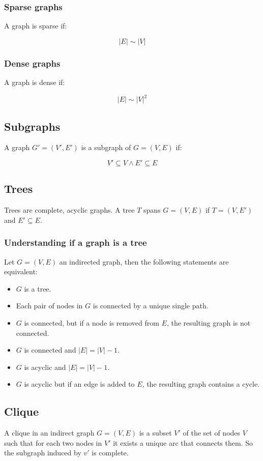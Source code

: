 		\subsubsection{Sparse graphs}
		A graph is sparse if:

		$$|E|\sim|V|$$

		\subsubsection{Dense graphs}
		A graph is dense if:

		$$|E|\sim|V|^2$$

	\subsection{Subgraphs}
	A graph $G' = (V', E')$ is a subgraph of $G = (V,E)$ if:

	$$V'\subseteq V \land E'\subseteq E$$

	\subsection{Trees}
	Trees are complete, acyclic graphs.
	A tree $ T$ spans $G = (V,E)$ if $T = (V,E')$ and $E'\subseteq E$.

		\subsubsection{Understanding if a graph is a tree}
		Let $G = (V,E)$ an indirected graph, then the following statements are equivalent:

		\begin{multicols}{2}
			\begin{itemize}
				\item $G$ is a tree.
				\item Each pair of nodes in $G$ is connected by a unique single path.
				\item $G$ is connected, but if a node is removed from $E$, the resulting graph is not connected.
				\item $G$ is connected and $|E| = |V|-1$.
				\item $G$ is acyclic and $|E| = |V|-1$.
				\item $G$ is acyclic but if an edge is added to $E$, the resulting graph contains a cycle.
			\end{itemize}
		\end{multicols}

	\subsection{Clique}
	A clique in an indirect graph $G = (V,E)$ is a subset $V'$ of the set of nodes $V$ such that for each two nodes in $V'$ it exists a unique arc that connects them.
	So the subgraph induced by $v'$ is complete.

